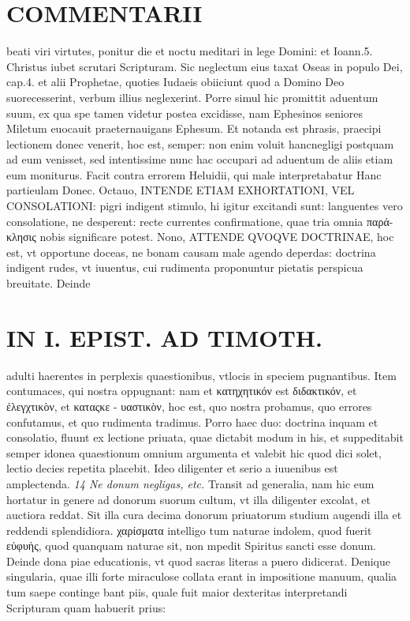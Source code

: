 \documentclass{article}
\begin{document}
\begin{pages}
\section*{COMMENTARII }
\marginpar{[ p.110 ]}\pstart beati viri virtutes, ponitur die et noctu meditari in lege Domini: et Ioann.5. Christus iubet scrutari Scripturam. Sic neglectum eius taxat Oseas in populo Dei, cap.4. et alii Prophetae, quoties Iudaeis obiiciunt quod a Domino Deo suorecesserint, verbum illius neglexerint.  \pend\pstart Porre simul hic promittit aduentum suum, ex qua spe tamen videtur postea excidisse, nam Ephesinos seniores Miletum euocauit praeternauigans Ephesum. Et notanda est phrasis, praecipi lectionem donec venerit, hoc est, semper: non enim voluit hancnegligi postquam ad eum venisset, sed intentissime nunc hac occupari ad aduentum de aliis etiam eum moniturus. Facit contra errorem Heluidii, qui male interpretabatur Hanc partieulam Donec.  \pend\pstart Octauo, INTENDE ETIAM EXHORTATIONI, VEL CONSOLATIONI: pigri indigent stimulo, hi igitur excitandi sunt: languentes vero consolatione, ne desperent: recte currentes confirmatione, quae tria omnia παρά- κλησις nobis significare potest.  \pend\pstart Nono, ATTENDE QVOQVE DOCTRINAE, hoc est, vt opportune doceas, ne bonam causam male agendo deperdas: doctrina indigent rudes, vt iuuentus, cui rudimenta proponuntur pietatis perspicua breuitate. Deinde  \pend
\section*{IN I. EPIST. AD TIMOTH. }
\marginpar{[ p.111 ]}\pstart adulti haerentes in perplexis quaestionibus, vtlocis in speciem pugnantibus. Item contumaces, qui nostra oppugnant: nam et κατηχητικόν est διδακτικόν, et ἐλεγχτικὸν, et καταςκε - υαστικὸν, hoc est, quo nostra probamus, quo errores confutamus, et quo rudimenta tradimus. Porro haec duo: doctrina inquam et consolatio, fluunt ex lectione priuata, quae dictabit modum in his, et suppeditabit semper idonea quaestionum omnium argumenta et valebit hic quod dici solet, lectio decies repetita placebit. Ideo diligenter et serio a iuuenibus est amplectenda.  \pend
\textit{14  Ne donum negligas, etc. }\pstart Transit ad generalia, nam hic eum hortatur in genere ad donorum suorum cultum, vt illa diligenter excolat, et auctiora reddat. Sit illa cura decima donorum priuatorum studium augendi illa et reddendi splendidiora. χαρίσματα intelligo tum naturae indolem, quod fuerit εὐφυὴς, quod quanquam naturae sit, non mpedit Spiritus sancti esse donum.  \pend\pstart Deinde dona piae educationis, vt quod sacras literas a puero didicerat. Denique singularia, quae illi forte miraculose collata erant in impositione manuum, qualia tum saepe continge bant piis, quale fuit maior dexteritas interpretandi Scripturam quam habuerit prius:  \pend

\end{pages}
\end{document}
